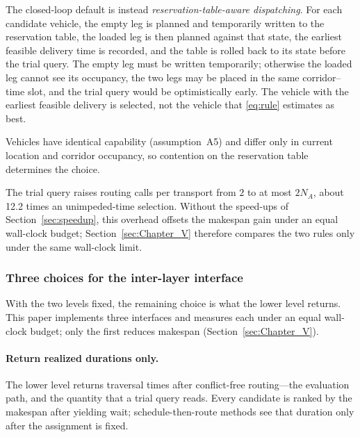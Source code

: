 \documentclass[manuscript,screen,review]{acmart}
\newcommand{\CostMultBefore}{12.2}
\begin{document}
The closed-loop default is instead \emph{reservation-table-aware dispatching}.
For each candidate vehicle, the empty leg is planned and temporarily written to the reservation table, the loaded leg is then planned against that state, the earliest feasible delivery time is recorded, and the table is rolled back to its state before the trial query.
The empty leg must be written temporarily; otherwise the loaded leg cannot see its occupancy, the two legs may be placed in the same corridor--time slot, and the trial query would be optimistically early.
The vehicle with the earliest feasible delivery is selected, not the vehicle that \eqref{eq:rule} estimates as best.

Vehicles have identical capability (assumption~A5) and differ only in current location and corridor occupancy, so contention on the reservation table determines the choice.

The trial query raises routing calls per transport from $2$ to at most $2N_A$, about \CostMultBefore{} times an unimpeded-time selection.
Without the speed-ups of Section~\ref{sec:speedup}, this overhead offsets the makespan gain under an equal wall-clock budget; Section~\ref{sec:Chapter_V} therefore compares the two rules only under the same wall-clock limit.

\subsubsection{Three choices for the inter-layer interface}
\label{sec:interface}

With the two levels fixed, the remaining choice is what the lower level returns.
This paper implements three interfaces and measures each under an equal wall-clock budget; only the first reduces makespan (Section~\ref{sec:Chapter_V}).

\paragraph{Return realized durations only.}
The lower level returns traversal times after conflict-free routing---the evaluation path, and the quantity that a trial query reads.
Every candidate is ranked by the makespan after yielding wait; schedule-then-route methods see that duration only after the assignment is fixed.
\end{document}
